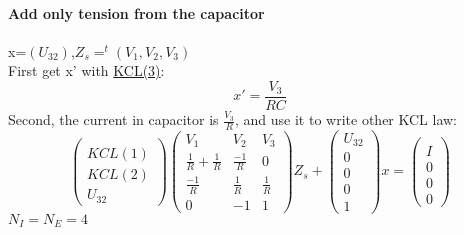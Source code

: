 \paragraph{Add only tension from the capacitor}
x=$(U_{32})$,$Z_{s}=^{t}(V_{1},V_{2},V_{3})$\\
First get x' with \underline{KCL(3)}:
\[x'=\frac{V_{3}}{RC}\]
Second, the current in capacitor is $\frac{V_{3}}{R}$, and use it to write other KCL law:
\[\left(\begin{array}{c}
  \\
  KCL(1)\\
  KCL(2)\\
  U_{32}
  \end{array}\right)
\left(\begin{array}{ccc}
V_{1}&V_{2}&V_{3}\\
  \hline
  \frac{1}{R}+\frac{1}{R}&  \frac{-1}{R}&0\\
  \frac{-1}{R}&  \frac{1}{R}&\frac{1}{R}\\
  0&-1&1
\end{array}\right)Z_{s}+
\left(\begin{array}{c}
U_{32}\\
  \hline
  0\\
  0\\
  0\\
  1
  \end{array}\right)x
=
\left(\begin{array}{c}
  \\
  I\\
  0\\
  0\\
  0
  \end{array}\right)
\]
$N_{I}=N_{E}=4$
\newpage
